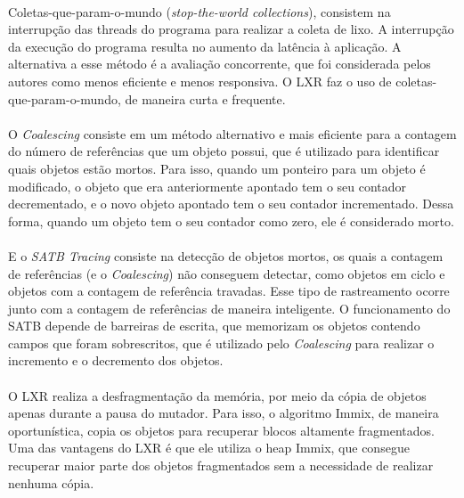 \documentclass[12pt]{article}
\begin{document}
\paragraph{}Coletas-que-param-o-mundo (\textit{stop-the-world collections}), consistem na interrupção das threads do programa para realizar a coleta de lixo. A interrupção da execução do programa resulta no aumento da latência à aplicação. A alternativa a esse método é a avaliação concorrente, que foi considerada pelos autores como menos eficiente e menos responsiva. O LXR faz o uso de coletas-que-param-o-mundo, de maneira curta e frequente.

\paragraph{}O \textit{Coalescing} consiste em um método alternativo e mais eficiente para a contagem do número de referências que um objeto possui, que é utilizado para identificar quais objetos estão mortos. Para isso, quando um ponteiro para um objeto é modificado, o objeto que era anteriormente apontado tem o seu contador decrementado, e o novo objeto apontado tem o seu contador incrementado. Dessa forma, quando um objeto tem o seu contador como zero, ele é considerado morto.

\paragraph{}E o \textit{SATB Tracing} consiste na detecção de objetos mortos, os quais a contagem de referências (e o \textit{Coalescing}) não conseguem detectar, como objetos em ciclo e objetos com a contagem de referência travadas. Esse tipo de rastreamento ocorre junto com a contagem de referências de maneira inteligente. O funcionamento do SATB depende de barreiras de escrita, que memorizam os objetos contendo campos que foram sobrescritos, que é utilizado pelo \textit{Coalescing} para realizar o incremento e o decremento dos objetos.

\paragraph{}O LXR realiza a desfragmentação da memória, por meio da cópia de objetos apenas durante a pausa do mutador. Para isso, o algoritmo Immix, de maneira oportunística, copia os objetos para recuperar blocos altamente fragmentados. Uma das vantagens do LXR é que ele utiliza o heap Immix, que consegue recuperar maior parte dos objetos fragmentados sem a necessidade de realizar nenhuma cópia.
\end{document}

